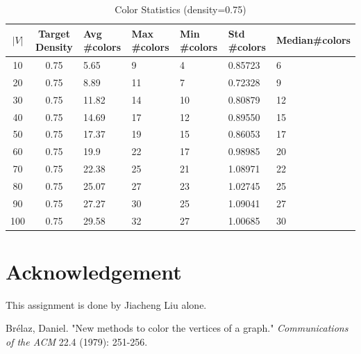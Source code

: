 \documentclass[paper=a4, fontsize=11pt]{scrartcl} %
\numberwithin{equation}{section} %
\numberwithin{figure}{section} %
\numberwithin{table}{section} %
\begin{document}
\begin{table}[H]
    \centering
    \begin{tabular}{cclllll}
    \toprule
$|V|$ & Target Density & Avg \#colors & Max \#colors &  Min \#colors & Std \#colors & Median\#colors\\ 
       \midrule
10 & 0.75 & 5.65 & 9 & 4 & 0.85723 & 6\\ 
20 & 0.75 & 8.89 & 11 & 7 & 0.72328 & 9\\ 
30 & 0.75 & 11.82 & 14 & 10 & 0.80879 & 12\\ 
40 & 0.75 & 14.69 & 17 & 12 & 0.89550 & 15\\ 
50 & 0.75 & 17.37 & 19 & 15 & 0.86053 & 17\\ 
60 & 0.75 & 19.9 & 22 & 17 & 0.98985 & 20\\ 
70 & 0.75 & 22.38 & 25 & 21 & 1.08971 & 22\\ 
80 & 0.75 & 25.07 & 27 & 23 & 1.02745 & 25\\ 
90 & 0.75 & 27.27 & 30 & 25 & 1.09041 & 27\\ 
100 & 0.75 & 29.58 & 32 & 27 & 1.00685 & 30\\
      \bottomrule
    \end{tabular}
    \caption{Color Statistics (density=0.75)}
    \label{tab:colors(density=0.75)}
\end{table}

\section{Acknowledgement}
This assignment is done by Jiacheng Liu alone. 

\begin{thebibliography}{10}
Brélaz, Daniel. 
"New methods to color the vertices of a graph." 
\textit{Communications of the ACM} 22.4 (1979): 251-256.

\end{thebibliography}
\end{document}
